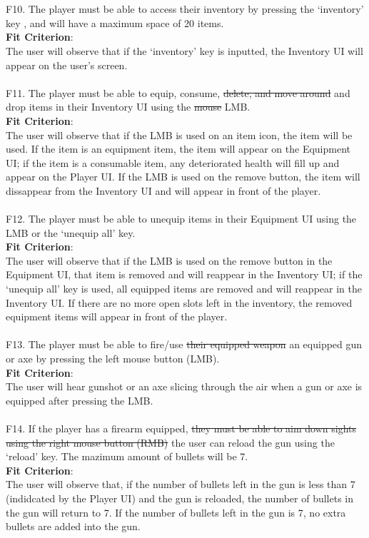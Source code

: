 \documentclass[12pt, titlepage]{article}
\begin{document}
\\\\
{\color{magenta} F10.} The player must be able to access their inventory by pressing the ‘inventory’ key{\color{magenta} , and will have a maximum space of 20 items. \\
\textbf{Fit Criterion}:\\ The user will observe that if the ‘inventory’ key is inputted, the Inventory UI will appear on the user's screen.}
\\\\
{\color{magenta} F11.} The player must be able to equip, consume, \sout{delete, and move around} {\color{magenta} and drop} items in their Inventory {\color{magenta} UI} using the \sout{mouse} {\color{magenta} LMB. \\
\textbf{Fit Criterion}:\\ The user will observe that if the LMB is used on an item icon, the item will be used. If the item is an equipment item, the item will appear on the Equipment UI; if the item is a consumable item, any deteriorated health will fill up and appear on the Player UI. If the LMB is used on the remove button, the item will dissappear from the Inventory UI and will appear in front of the player.}
\\\\
{\color{magenta} F12. The player must be able to unequip items in their Equipment UI using the LMB or the `unequip all’  key. \\
\textbf{Fit Criterion}:\\ The user will observe that if the LMB is used on the remove button in the Equipment UI, that item is removed and will reappear in the Inventory UI; if the ‘unequip all’  key is used, all equipped items are removed and will reappear in the Inventory UI. If there are no more open slots left in the inventory, the removed equipment items will appear in front of the player.}
\\\\
{\color{magenta} F13.} The player must be able to fire/use \sout{their equipped weapon} {\color{magenta} an equipped gun or axe} by pressing the left mouse button (LMB). \\
{\color{magenta} \textbf{Fit Criterion}:\\ The user will hear gunshot or an axe slicing through the air when a gun or axe is equipped after pressing the LMB. }
\\\\
{\color{magenta} F14.} If the player has a firearm equipped, \sout{they must be able to aim down sights using the right mouse button (RMB)} {\color{magenta} the user can reload the gun using the ‘reload’ key. The mazimum amount of bullets will be 7. \\
\textbf{Fit Criterion}:\\ The user will observe that, if the number of bullets left in the gun is less than 7 (indidcated by the Player UI) and the gun is reloaded, the number of bullets in the gun will return to 7. If the number of bullets left in the gun is 7, no extra bullets are added into the gun.}
\end{document}
